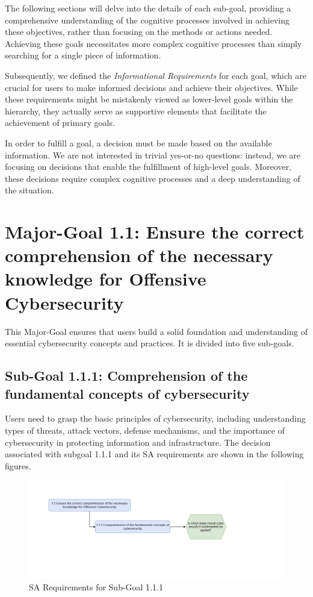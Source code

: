 The following sections will delve into the details of each sub-goal, providing a comprehensive understanding of the cognitive processes involved in achieving these objectives, rather than focusing on the methods or actions needed.
Achieving these goals necessitates more complex cognitive processes than simply searching for a single piece of information.

Subsequently, we defined the \textit{Informational Requirements} for each goal, which are crucial for users to make informed decisions and achieve their objectives. While these requirements might be mistakenly viewed as lower-level goals within the hierarchy, they actually serve as supportive elements that facilitate the achievement of primary goals.

In order to fulfill a goal, a decision must be made based on the available information. We are not interested in trivial yes-or-no questions: instead, we are focusing on decisions that enable the fulfillment of high-level goals. Moreover, these decisions require complex cognitive processes and a deep understanding of the situation.

\newpage
\section{Major-Goal 1.1: Ensure the correct comprehension of the necessary knowledge for Offensive Cybersecurity}
This Major-Goal ensures that users build a solid foundation and understanding of essential cybersecurity concepts and practices. It is divided into five sub-goals.

\subsection{Sub-Goal 1.1.1: Comprehension of the fundamental concepts of cybersecurity }
Users need to grasp the basic principles of cybersecurity, including understanding types of threats, attack vectors, defense mechanisms, and the importance of cybersecurity in protecting information and infrastructure.
The decision associated with subgoal 1.1.1 and its SA requirements are shown in the following figures.
\begin{figure}[H]
    \centering
    \includegraphics[width=\textwidth]{./assets/subgoal_1.1.1.png}
    \caption{SA Requirements for Sub-Goal 1.1.1}
    \label{fig:subgoal_1.1.1}
\end{figure}

